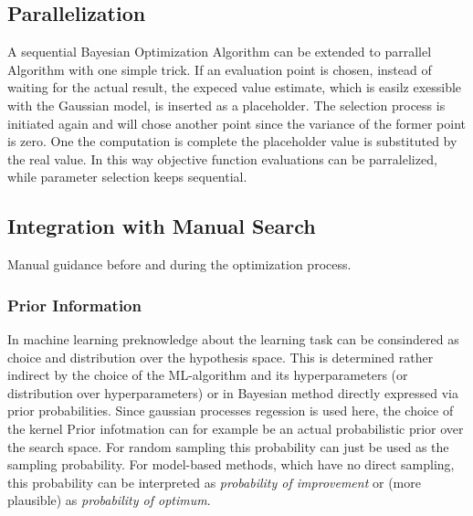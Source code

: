 \documentclass[english]{article}
\begin{document}
\subsection{Parallelization}
A sequential Bayesian Optimization Algorithm can be extended to parrallel Algorithm with one simple trick. If an evaluation point is chosen, instead of waiting for the actual result, the expeced value estimate, which is easilz exessible with the Gaussian model, is inserted as a placeholder. The selection process is initiated again and will chose another point since the variance of the former point is zero. One the computation is complete the placeholder value is substituted by the real value. In this way objective function evaluations can be parralelized, while parameter selection keeps sequential.

\subsection{Integration with Manual Search}
Manual guidance before and during the optimization process.

\subsubsection{Prior Information}
In machine learning preknowledge about the learning task can be consindered as choice and distribution over the hypothesis space. This is determined rather indirect by the choice of the \ac{ML}-algorithm and its hyperparameters (or distribution over hyperparameters) or in Bayesian method directly expressed via prior probabilities. Since gaussian processes regession is used here, the choice of the kernel
Prior infotmation can for example be an actual probabilistic prior over the search space. For random sampling this probability can just be used as the sampling probability. For model-based methods, which have no direct sampling, this probability can be interpreted as \textit{probability of improvement} or (more plausible) as \textit{probability of optimum}.
\end{document}

